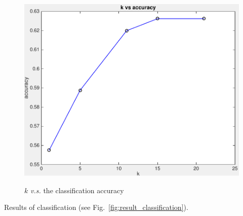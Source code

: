 \documentclass[12pt]{article}
\begin{document}
\begin{figure}[ht!]
	\caption{$k$ \textit{v.s.} the classification accuracy}
	\centering \includegraphics[width=0.9\linewidth]{./figures/k_vs_accuracy.pdf} 
	\label{fig:q5_10_k}
\end{figure}

Results of classification (see Fig.~\ref{fig:result_classification}).
\end{document}
